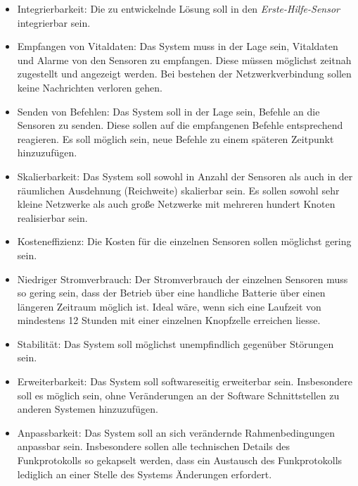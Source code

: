     \begin{itemize}
        \item{Integrierbarkeit:} Die zu entwickelnde Lösung soll in den \emph{Erste-Hilfe-Sensor}
                                 integrierbar sein.
        \item{Empfangen von Vitaldaten:} Das System muss in der Lage sein, Vitaldaten und Alarme  
                                         von den Sensoren zu empfangen. Diese müssen möglichst zeitnah
                                         zugestellt und angezeigt werden. Bei bestehen der Netzwerkverbindung
                                         sollen keine Nachrichten verloren gehen. 
        \item{Senden von Befehlen:} Das System soll in der Lage sein, Befehle an die Sensoren zu senden.
                                    Diese sollen auf die empfangenen Befehle entsprechend reagieren. Es
                                    soll möglich sein, neue Befehle zu einem späteren Zeitpunkt hinzuzufügen.
        \item{Skalierbarkeit:} Das System soll sowohl in Anzahl der Sensoren als auch in der räumlichen 
                               Ausdehnung (Reichweite) skalierbar sein. Es sollen sowohl sehr kleine Netzwerke
                               als auch große Netzwerke mit mehreren hundert Knoten realisierbar sein.
        \item{Kosteneffizienz:} Die Kosten für die einzelnen Sensoren sollen möglichst gering sein.
        \item{Niedriger Stromverbrauch:} Der Stromverbrauch der einzelnen Sensoren muss so gering sein, dass
                                         der Betrieb über eine handliche Batterie über einen längeren 
                                         Zeitraum möglich ist. Ideal wäre, wenn sich eine Laufzeit von
                                         mindestens 12 Stunden mit einer einzelnen Knopfzelle erreichen
                                         liesse.
        \item{Stabilität:} Das System soll möglichst unempfindlich gegenüber Störungen sein.
        \item{Erweiterbarkeit:} Das System soll softwareseitig erweiterbar sein. Insbesondere soll es 
                            möglich sein, ohne Veränderungen an der Software Schnittstellen
                            zu anderen Systemen hinzuzufügen. 
        \item{Anpassbarkeit:} Das System soll an sich verändernde Rahmenbedingungen anpassbar sein. Insbesondere
                          sollen alle technischen Details des Funkprotokolls so gekapselt werden, dass ein
                          Austausch des Funkprotokolls lediglich an einer Stelle des Systems Änderungen
                          erfordert.
    \end{itemize}

